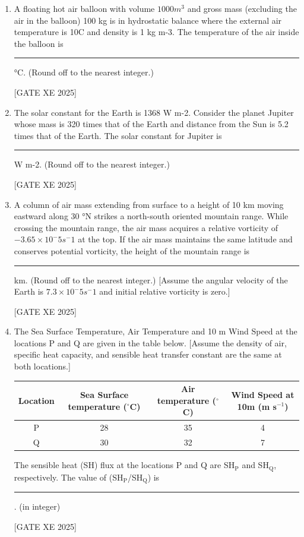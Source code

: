\documentclass[journal,12pt,onecolumn]{IEEEtran}
\theoremstyle{remark}
\begin{document}
\begin{enumerate}
\hfill[GATE XE 2025]

\item A floating hot air balloon with volume $1000 m^3$ and gross mass (excluding the air in the balloon) 100 kg is in hydrostatic balance where the external air temperature is 10\degree C and density is 1 kg m-3. The temperature of the air inside the balloon is \rule{3cm}{0.15mm} °C. (Round off to the nearest integer.)

\hfill[GATE XE 2025]

\item The solar constant for the Earth is 1368 W m-2. Consider the planet Jupiter whose mass is 320 times that of the Earth and distance from the Sun is 5.2 times that of the Earth. The solar constant for Jupiter is \rule{3cm}{0.15mm} W m-2. (Round off to the nearest integer.)

\hfill[GATE XE 2025]

\item A column of air mass extending from surface to a height of 10 km moving eastward along 30 °N strikes a north-south oriented mountain range. While crossing the mountain range, the air mass acquires a relative vorticity of $-3.65 × 10^-5 s^-1$ at the top. If the air mass maintains the same latitude and conserves potential vorticity, the height of the mountain range is \rule{3cm}{0.15mm} km. (Round off to the nearest integer.)
[Assume the angular velocity of the Earth is $7.3 × 10^-5 s^-1$ and initial relative vorticity is zero.]

\hfill[GATE XE 2025]

\item The Sea Surface Temperature, Air Temperature and 10 m Wind Speed at the locations P and Q are given in the table below. [Assume the density of air, specific heat capacity, and sensible heat transfer constant are the same at both locations.]

\begin{tabular}{|c|c|c|c|}
\hline
Location & Sea Surface temperature ($^{\circ}$C) & Air temperature ($^{\circ}$C) & Wind Speed at 10m (m s$^{-1}$) \\
\hline
P & 28 & 35 & 4 \\
\hline
Q & 30 & 32 & 7 \\
\hline
\end{tabular}

The sensible heat (SH) flux at the locations P and Q are SH\(_\text{P}\) and SH\(_\text{Q}\), respectively. The value of (SH\(_\text{P}\)/SH\(_\text{Q}\)) is \rule{3cm}{0.15mm}. (in integer)

\hfill[GATE XE 2025]

\end{enumerate}
\end{document}
